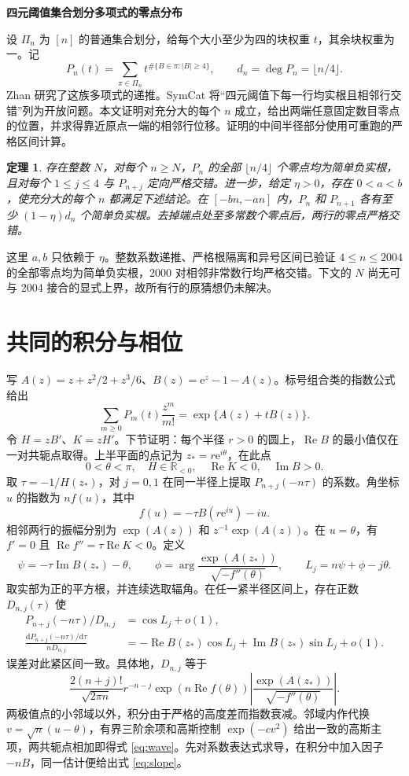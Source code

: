 \documentclass[UTF8,fontset=fandol,11pt,a4paper]{ctexart}
\newcommand{\Rea}{\operatorname{Re}}
\newcommand{\Ima}{\operatorname{Im}}
\newcommand{\expo}{\mathrm e}
\newcommand{\dd}{\mathrm d}
\newtheorem*{mainthm}{定理}
\begin{document}
\begin{center}
{\LARGE\bfseries 四元阈值集合划分多项式的零点分布}\par
\vspace{1.6mm}{\small MathLab 研究稿\quad 2026 年 11 月 26 日}
\end{center}

设 $\Pi_n$ 为 $[n]$ 的普通集合划分，给每个大小至少为四的块权重 $t$，其余块权重为一。记
\[
 P_n(t)=\sum_{\pi\in\Pi_n}t^{\#\{B\in\pi:|B|\ge4\}},\qquad d_n=\deg P_n=\lfloor n/4\rfloor .
\]
Zhan 研究了这族多项式的递推。SymCat 将“四元阈值下每一行均实根且相邻行交错”列为开放问题。本文证明对充分大的每个 $n$ 成立，给出两端任意固定数目零点的位置，并求得靠近原点一端的相邻行位移。证明的中间半径部分使用可重跑的严格区间计算。

\begin{mainthm}
存在整数 $N$，对每个 $n\ge N$，$P_n$ 的全部 $\lfloor n/4\rfloor$ 个零点均为简单负实根，且对每个 $1\le j\le4$ 与 $P_{n+j}$ 定向严格交错。进一步，给定 $\eta>0$，存在 $0<a<b$，使充分大的每个 $n$ 都满足下述结论。在 $[-bn,-an]$ 内，$P_n$ 和 $P_{n+1}$ 各有至少 $(1-\eta)d_n$ 个简单负实根。去掉端点处至多常数个零点后，两行的零点严格交错。
\end{mainthm}
这里 $a,b$ 只依赖于 $\eta$。整数系数递推、严格根隔离和异号区间已验证 $4\le n\le2004$ 的全部零点均为简单负实根，2000 对相邻非常数行均严格交错。下文的 $N$ 尚无可与 2004 接合的显式上界，故所有行的原猜想仍未解决。

\section{共同的积分与相位}
写 $A(z)=z+z^2/2+z^3/6$、$B(z)=\expo^z-1-A(z)$。标号组合类的指数公式给出
\[
 \sum_{m\ge0}P_m(t)\frac{z^m}{m!}=\exp\{A(z)+tB(z)\}.
\]
令 $H=zB'$、$K=zH'$。下节证明：每个半径 $r>0$ 的圆上，$\Rea B$ 的最小值仅在一对共轭点取得。上半平面的点记为 $z_*=r\expo^{i\theta}$，在此点
\[
 0<\theta<\pi,\quad H\in\mathbb R_{<0},\quad \Rea K<0,\quad \Ima B>0.\tag{S}
\]
取 $\tau=-1/H(z_*)$，对 $j=0,1$ 在同一半径上提取 $P_{n+j}(-n\tau)$ 的系数。角坐标 $u$ 的指数为 $nf(u)$，其中
\[
 f(u)=-\tau B(r\expo^{iu})-iu.
\]
相邻两行的振幅分别为 $\exp(A(z))$ 和 $z^{-1}\exp(A(z))$。在 $u=\theta$，有 $f'=0$ 且 $\Rea f''=\tau\Rea K<0$。定义
\[
 \psi=-\tau\Ima B(z_*)-\theta,\qquad
 \phi=\arg\frac{\exp(A(z_*))}{\sqrt{-f''(\theta)}},\qquad
 L_j=n\psi+\phi-j\theta .
\]
取实部为正的平方根，并连续选取辐角。在任一紧半径区间上，存在正数 $D_{n,j}(\tau)$ 使
\begin{align}
 P_{n+j}(-n\tau)/D_{n,j}&=\cos L_j+o(1),\label{eq:wave}\\
 \frac{\dd P_{n+j}(-n\tau)/\dd\tau}{nD_{n,j}}
 &=-\Rea B(z_*)\cos L_j+\Ima B(z_*)\sin L_j+o(1).\label{eq:slope}
\end{align}
误差对此紧区间一致。具体地，$D_{n,j}$ 等于
\[
 \frac{2(n+j)!}{\sqrt{2\pi n}}r^{-n-j}\exp(n\Rea f(\theta))
 \left|\frac{\exp(A(z_*))}{\sqrt{-f''(\theta)}}\right|.
\]
两极值点的小邻域以外，积分由于严格的高度差而指数衰减。邻域内作代换 $v=\sqrt n(u-\theta)$，有界三阶余项和高斯控制 $\exp(-c v^2)$ 给出一致的高斯主项，两共轭点相加即得式 \eqref{eq:wave}。先对系数表达式求导，在积分中加入因子 $-nB$，同一估计便给出式 \eqref{eq:slope}。
\end{document}
